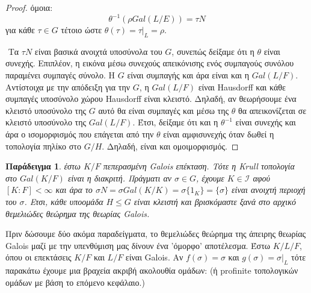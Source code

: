 \documentclass[oneside,a4paper]{article}
\newtheorem{example}{Παράδειγμα}
\newcommand {\tl}{\textlatin}
\begin{document}
\begin{proof}
όμοια: 
$$\theta^{-1} (\rho Gal(L/E)) = \tau N$$
για κάθε $\tau \in G$ τέτοιο ώστε $\theta (\tau) = \tau|_L = \rho$. 

$ $\newline
Τα $\tau N$ είναι βασικά ανοιχτά υποσύνολα του $G$, συνεπώς δείξαμε ότι η $\theta$ είναι συνεχής. Επιπλέον, η εικόνα μέσω συνεχούς απεικόνισης ενός συμπαγούς συνόλου παραμένει συμπαγές σύνολο. H $G$ είναι συμπαγής και άρα είναι και η $Gal(L/F)$. Αντίστοιχα με την απόδειξη για την $G$, η $Gal(L/F)$ είναι \tl{Hausdorff} και κάθε συμπαγές υποσύνολο χώρου \tl{Hausdorff} είναι κλειστό. Δηλαδή, αν θεωρήσουμε ένα κλειστό υποσύνολο της $G$ αυτό θα είναι συμπαγές και μέσω της $\theta$ θα απεικονίζεται σε κλειστό υποσύνολο της $Gal(L/F)$. Έτσι, δείξαμε ότι και η $\theta^{-1}$ είναι συνεχής και άρα ο ισομορφισμός που επάγεται από την $\theta$ είναι αμφισυνεχής όταν δωθεί η τοπολογία πηλίκο στο $G/H$. Δηλαδή, είναι και ομοιμορφισμός.
\end{proof}

\begin{example}
έστω $K/F$ πεπερασμένη \tl{Galois} επέκταση. Τότε η \tl{Krull} τοπολογία στο $Gal(K/F)$ είναι η διακριτή. Πράγματι αν $\sigma \in G$, έχουμε $K\in \mathcal I$ αφού $[K:F]<\infty$ και άρα το $\sigma N = \sigma Gal(K/K) = \sigma \{1_K\} = \{ \sigma\}$ είναι ανοιχτή περιοχή του $\sigma$. Ετσι, κάθε υποομάδα $H\leq G$ είναι κλειστή και βρισκόμαστε ξανά στο αρχικό θεμελιώδες θεώρημα της θεωρίας \tl{Galois}.
\end{example}

$ $\newline Πριν δώσουμε δύο ακόμα παραδείγματα, το θεμελιώδες θεώρημα της άπειρης θεωρίας \tl{Galois} μαζί με την υπενθύμιση μας δίνουν ένα 'όμορφο' αποτέλεσμα. Έστω $K/L/F$, όπου οι επεκτάσεις $K/F$ και $L/F$ είναι \tl{Galois}. Αν $f(\sigma) = \sigma$ και $g(\sigma) = \sigma|_L$ τότε παρακάτω έχουμε μια βραχεία ακριβή ακολουθία ομάδων: (ή \tl{profinite} τοπολογικών ομάδων με βάση το επόμενο κεφάλαιο.)

\begin{center}
\end{center}

\vspace{0.3truecm}
\end{document}
